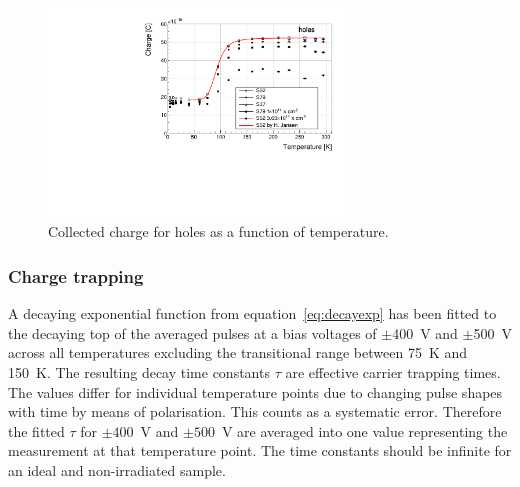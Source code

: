 \begin{figure}[!t]
\centering
\includegraphics[width=0.70\textwidth]{../scripts/03_experimental_results/plots/charge-500V}
\caption{Collected charge for holes as a function of temperature.}
 \label{fig:chgtempholes}
\end{figure}

\subsubsection{Charge trapping}
A decaying exponential function from equation~\ref{eq:decayexp} has been fitted to the decaying top of the averaged pulses at a bias voltages of $\pm$400~V and $\pm$500~V across all temperatures excluding the transitional range between 75~K and 150~K. The resulting decay time constants $\tau$ are effective carrier trapping times. The values differ for individual temperature points due to changing pulse shapes with time by means of polarisation. This counts as a systematic error. Therefore the fitted $\tau$ for $\pm400$~V and $\pm500$~V are averaged into one value representing the measurement at that temperature point. The time constants should be infinite for an ideal and non-irradiated sample. %

